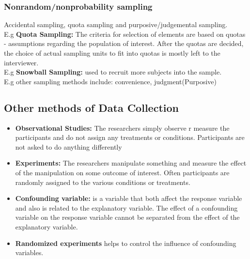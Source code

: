 \documentclass{article}
\theoremstyle{definition}
\theoremstyle{thrm}
\theoremstyle{lma}
\theoremstyle{ppst}
\theoremstyle{crlr}
\begin{document}
\subsubsection{Nonrandom/nonprobability sampling} 
Accidental sampling, quota sampling and purposive/judgemental sampling.\\
E.g \textbf{Quota Sampling: } The criteria for selection of elements are based on quotas - assumptions regarding the population of interest. After the quotas are decided, the choice of actual sampling units to fit into quotas is mostly left to the interviewer.\\
E.g \textbf{Snowball Sampling: } used to recruit more subjects into the sample. \\
E.g other sampling methods include: convenience, judgment(Purposive)

\subsection{Other methods of Data Collection}
\begin{itemize}
	\item \textbf{Observational Studies: } The researchers simply observe r measure the participants and do not assign any treatments or conditions. Participants are not asked to do anything differently
	\item \textbf{Experiments: }The researchers manipulate something and measure the effect of the manipulation on some outcome of interest. Often participants are randomly assigned to the various conditions or treatments. 
	\item \textbf{Confounding variable: } is a variable that both affect the response variable and also is related to the explanatory variable. The effect of a confounding variable on the response variable cannot be separated from the effect of the explanatory variable. 
	\item \textbf{Randomized experiments} helps to control the influence of confounding variables. 
\end{itemize}
\end{document}
